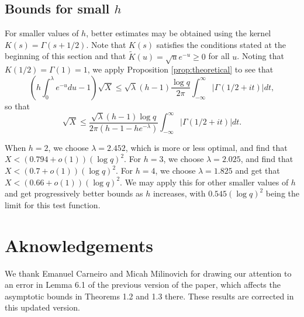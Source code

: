 \documentclass [12pt]{amsart}
\numberwithin{equation}{section}
\begin{document}
\subsection{Bounds for small $h$} For smaller values of $h$, 
better estimates may be obtained using the kernel $K(s) = \Gamma(s+1/2)$.  Note that $K(s)$ satisfies the conditions stated at the beginning of this section and that ${\tilde K}(u) = \sqrt{u} e^{-u} \geq 0$ for all $u$.  Noting that $K(1/2) = \Gamma(1) = 1$, we apply Proposition \ref{prop:theoretical} to see that
$$\left( h \int_0^\lambda e^{-u} du - 1\right) \sqrt{X} \le \sqrt{\lambda} (h-1) \frac{\log q}{2\pi} \int_{-\infty}^\infty \left|\Gamma(1/2 + it) \right| dt, 
$$so that
\begin{equation*}
\sqrt{X} \le \frac{\sqrt{\lambda}(h-1) \log q}{2\pi (h-1-he^{-\lambda})} \int_{-\infty}^\infty \left|\Gamma(1/2 + it) \right| dt.
\end{equation*}

When $h=2$, we choose $\lambda = 2.452$, which is more or less optimal, and 
find that $X < (0.794+o(1))(\log q)^2$.  For $h=3$, we choose $\lambda = 2.025$, and find that $X < (0.7+o(1))(\log q)^2$.  For $h = 4$, we choose $\lambda= 1.825$ and get that $X < (0.66+o(1))(\log q)^2$.  We may apply this for other smaller values of $h$ and get progressively better bounds as $h$ increases, with $0.545(\log q)^2$ being the limit for this test function.

 \section*{Aknowledgements}
We thank Emanuel Carneiro and Micah Milinovich for drawing our attention to an error in Lemma 6.1 of the previous version of the paper, which affects the asymptotic bounds in Theorems 1.2 and 1.3 there. These results are corrected in this updated version.
 
\end{document}

